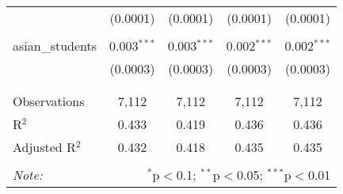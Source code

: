 \begin{table}[!htbp]
\begin{tabular}{@{\extracolsep{-2pt}}lcccc}
  & (0.0001) & (0.0001) & (0.0001) & (0.0001) \\ 
  & & & & \\ 
 asian\_students & 0.003$^{***}$ & 0.003$^{***}$ & 0.002$^{***}$ & 0.002$^{***}$ \\ 
  & (0.0003) & (0.0003) & (0.0003) & (0.0003) \\ 
  & & & & \\ 
\hline \\[-1.8ex] 
Observations & 7,112 & 7,112 & 7,112 & 7,112 \\ 
R$^{2}$ & 0.433 & 0.419 & 0.436 & 0.436 \\ 
Adjusted R$^{2}$ & 0.432 & 0.418 & 0.435 & 0.435 \\ 
\hline 
\hline \\[-1.8ex] 
\textit{Note:}  & \multicolumn{4}{r}{$^{*}$p$<$0.1; $^{**}$p$<$0.05; $^{***}$p$<$0.01} \\ 
\end{tabular} 
\end{table} 
